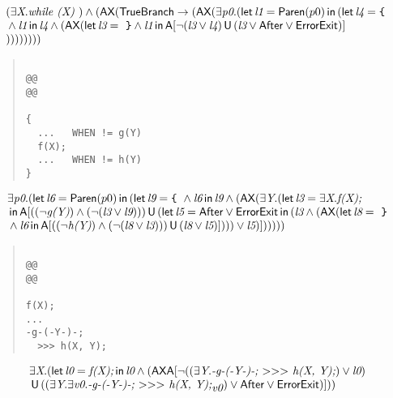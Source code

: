 \documentclass{article}
\newcommand{\U}{\,\mbox{\sf{U}}\,}
\newcommand{\A}{\mbox{\sf{A}}}
\newcommand{\AX}{\mbox{\sf{AX}}}
\newcommand{\mita}[1]{\mbox{\it{{#1}}}}
\newcommand{\msf}[1]{\mbox{\sf{{#1}}}}
\newcommand{\mth}[1]{\({#1}\)}
\newcommand{\ttlb}{\mbox{\tt \char'173}}
\newcommand{\ttrb}{\mbox{\tt \char'175}}
\begin{document}
\[\begin{array}{l}
(\exists \mita{X} . \mita{while (X) }) \wedge (\AX(\msf{TrueBranch} \rightarrow (\AX(\exists \mita{p0} . (\mita{\sf{let}} \, \mita{l1} = \msf{Paren}(p0) \, \mita{\sf{in}} \, (\mita{\sf{let}} \, \mita{l4} = \mita{{\ttlb}
  }\\\mbox{} \wedge \mita{l1} \, \mita{\sf{in}} \, \mita{l4} \wedge (\AX(\mita{\sf{let}} \, \mita{l3} = \mita{
{\ttrb}} \wedge \mita{l1} \, \mita{\sf{in}} \, \A[\neg (\mita{l3} \vee \mita{l4}) \U (\mita{l3} \vee \msf{After} \vee \msf{ErrorExit})]
\\\mbox{}
))
)
)))))
\end{array}\]

\begin{quote}\begin{verbatim}

@@
@@

{
  ...   WHEN != g(Y)
  f(X);
  ...   WHEN != h(Y)
}
\end{verbatim}\end{quote}

\[\begin{array}{l}
\exists \mita{p0} . (\mita{\sf{let}} \, \mita{l6} = \msf{Paren}(p0) \, \mita{\sf{in}} \, (\mita{\sf{let}} \, \mita{l9} = \mita{{\ttlb}
  } \wedge \mita{l6} \, \mita{\sf{in}} \, \mita{l9} \wedge (\AX(\exists \mita{Y} . (\mita{\sf{let}} \, \mita{l3} = \exists \mita{X} . \mita{f(X);}\\\mbox{} \, \mita{\sf{in}} \, \A[((\neg \mita{g(Y)}) \wedge (\neg (\mita{l3} \vee \mita{l9}))) \U (\mita{\sf{let}} \, \mita{l5} = \msf{After} \vee \msf{ErrorExit} \, \mita{\sf{in}} \, (\mita{l3} \wedge (\AX(\mita{\sf{let}} \, \mita{l8} = \mita{
{\ttrb}}\\\mbox{} \wedge \mita{l6} \, \mita{\sf{in}} \, \A[((\neg \mita{h(Y)}) \wedge (\neg (\mita{l8} \vee \mita{l3}))) \U (\mita{l8} \vee \mita{l5})]

))) \vee \mita{l5}
)]

)))
)
)
\end{array}\]

\begin{quote}\begin{verbatim}

@@
@@

f(X);
...
-g-(-Y-)-;
  >>> h(X, Y);

\end{verbatim}\end{quote}

\[\begin{array}{l}
\exists \mita{X} . (\mita{\sf{let}} \, \mita{l0} = \mita{f(X);} \, \mita{\sf{in}} \, \mita{l0} \wedge (\AX\A[\neg ((\exists \mita{Y} . \mita{-g-(-Y-)-;
  \mth{>}\mth{>}\mth{>} h(X, Y);}) \vee \mita{l0})\\\mbox{} \U ((\exists \mita{Y} . \exists \mita{v0} . \mita{-g-(-Y-)-;
  \mth{>}\mth{>}\mth{>} h(X, Y);}_{\mita{v0}}) \vee \msf{After} \vee \msf{ErrorExit})]
)
)
\end{array}\]
\end{document}
